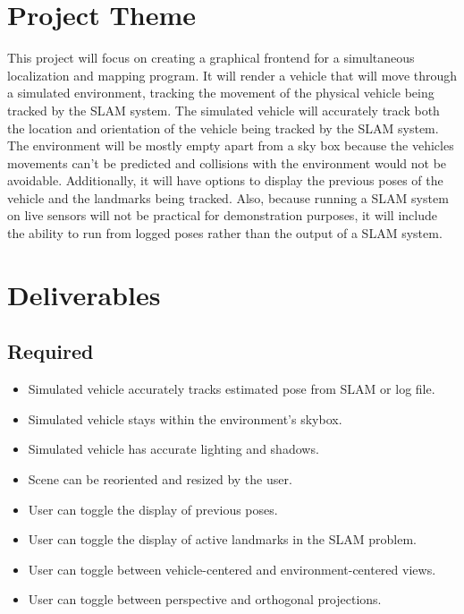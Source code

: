 \documentclass[11pt]{article}
\begin{document}
\thispagestyle{empty}

\newlength{\boxlength}\setlength{\boxlength}{\textwidth}
\addtolength{\boxlength}{-4mm}

\begin{center}
\end{center}

\section*{Project Theme}
This project will focus on creating a graphical frontend for a simultaneous localization and mapping program. It will render a vehicle that will move through a simulated environment, tracking the movement of the physical vehicle being tracked by the SLAM system. The simulated vehicle will accurately track both the location and orientation of the vehicle being tracked by the SLAM system. The environment will be mostly empty apart from a sky box because the vehicles movements can't be predicted and collisions with the environment would not be avoidable. Additionally, it will have options to display the previous poses of the vehicle and the landmarks being tracked. Also, because running a SLAM system on live sensors will not be practical for demonstration purposes, it will include the ability to run from logged poses rather than the output of a SLAM system.

\section*{Deliverables}

\subsection*{Required}
\begin{itemize}
\item Simulated vehicle accurately tracks estimated pose from SLAM or log file.
\item Simulated vehicle stays within the environment's skybox.
\item Simulated vehicle has accurate lighting and shadows.
\item Scene can be reoriented and resized by the user.
\item User can toggle the display of previous poses.
\item User can toggle the display of active landmarks in the SLAM problem.
\item User can toggle between vehicle-centered and environment-centered views.
\item User can toggle between perspective and orthogonal projections. 
\end{itemize}
\end{document}
